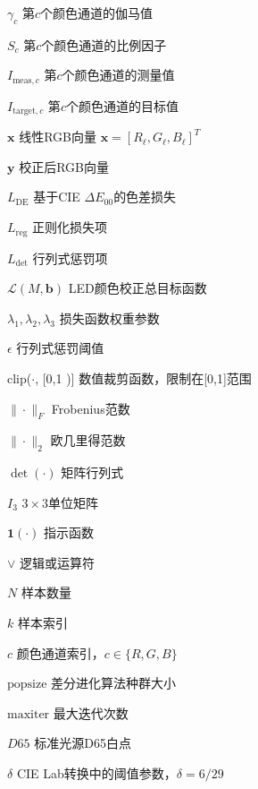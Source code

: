 \begin{denotation}[0mm][15mm]
	\item[$\gamma_c$] 第$c$个颜色通道的伽马值
	\item[$S_c$] 第$c$个颜色通道的比例因子
	\item[$I_{\text{meas},c}$] 第$c$个颜色通道的测量值
	\item[$I_{\text{target},c}$] 第$c$个颜色通道的目标值
	\item[$\mathbf{x}$] 线性RGB向量 $\mathbf{x} = [R_\ell, G_\ell, B_\ell]^T$
	\item[$\mathbf{y}$] 校正后RGB向量
	\item[$L_{\mathrm{DE}}$] 基于CIE $\Delta E_{00}$的色差损失
	\item[$L_{\mathrm{reg}}$] 正则化损失项
	\item[$L_{\det}$] 行列式惩罚项
	\item[$\mathcal{L}(M,\mathbf{b})$] LED颜色校正总目标函数
	\item[$\lambda_1, \lambda_2, \lambda_3$] 损失函数权重参数
	\item[$\epsilon$] 行列式惩罚阈值
	\item[$\text{clip}$($\cdot$, [0,1])] 数值裁剪函数，限制在[0,1]范围
	
	\item[$\|\cdot\|_F$] Frobenius范数
	\item[$\|\cdot\|_2$] 欧几里得范数
	\item[$\det(\cdot)$] 矩阵行列式
	\item[$I_3$] $3 \times 3$单位矩阵
	\item[$\mathbf{1}(\cdot)$] 指示函数
	\item[$\lor$] 逻辑或运算符
	
	\item[$N$] 样本数量
	\item[$k$] 样本索引
	\item[$c$] 颜色通道索引，$c \in \{R,G,B\}$
	\item[$\text{popsize}$] 差分进化算法种群大小
	\item[$\text{maxiter}$] 最大迭代次数
	\item[$D65$] 标准光源D65白点
	\item[$\delta$] CIE Lab转换中的阈值参数，$\delta = 6/29$
\end{denotation}

\endinput